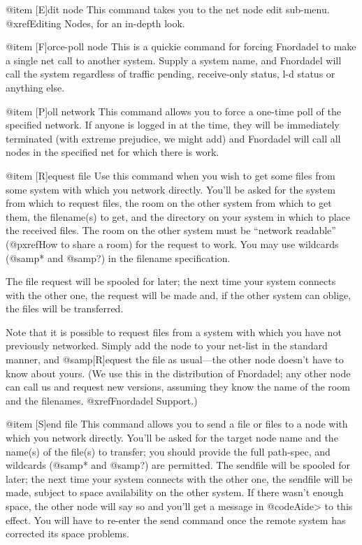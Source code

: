 @item [E]dit node
This command takes you to the net node edit sub-menu.
@xref{Editing Nodes}, for an in-depth look.

@item [F]orce-poll node
This is a quickie command for forcing Fnordadel to make
a single net call to another system.  Supply a system name, and
Fnordadel will call the system regardless of traffic pending,
receive-only status, l-d status or anything else.

@item [P]oll network
This command allows you to force a one-time poll of the
specified network.  If anyone is logged in at the time, they will
be immediately terminated (with extreme prejudice, we might
add) and Fnordadel will call all nodes in the specified net
for which there is work.

@item [R]equest file
Use this command when you wish to get some files from some
system with which you network directly.  You'll be asked for the
system from which to request files, the room on the other system
from which to get them, the filename(s) to get, and the directory
on your system in which to place the received files.  The room on
the other system must be ``network readable'' (@pxref{How to share a room})
for the request to work.  You may use wildcards (@samp{*} and @samp{?}) in the
filename specification.

The file request will be spooled for later; the next time
your system connects with the other one, the request will be made
and, if the other system can oblige, the files will be transferred.

Note that it is possible to request files from a system
with which you have not previously networked.  Simply add the node
to your net-list in the standard manner, and @samp{[R]equest} the file as
usual---the other node doesn't have to know about yours.  (We use
this in the distribution of Fnordadel; any other node can call
us and request new versions, assuming they know the name of the
room and the filenames.  @xref{Fnordadel Support}.)

@item [S]end file
This command allows you to send a file or files to a node
with which you network directly.  You'll be asked for the target
node name and the name(s) of the file(s) to transfer; you should
provide the full path-spec, and wildcards (@samp{*} and @samp{?}) are permitted.
The sendfile will be spooled for later; the next time your system
connects with the other one, the sendfile will be made, subject
to space availability on the other system.  If there wasn't enough
space, the other node will say so and you'll get a message in
@code{Aide>} to this effect.  You will have to re-enter the send command
once the remote system has corrected its space problems.


